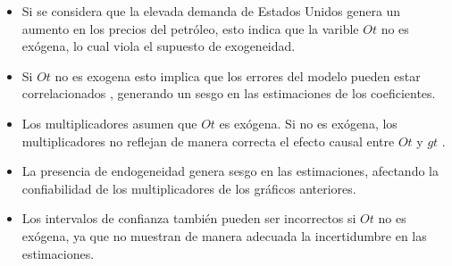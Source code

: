 \documentclass[
  12pt,
]{article}
\begin{document}
\begin{itemize}
\item
  Si se considera que la elevada demanda de Estados Unidos genera un
  aumento en los precios del petróleo, esto indica que la varible \(Ot\)
  no es exógena, lo cual viola el supuesto de exogeneidad.
\item
  Si \(Ot\) no es exogena esto implica que los errores del modelo pueden
  estar correlacionados , generando un sesgo en las estimaciones de los
  coeficientes.
\item
  Los multiplicadores asumen que \(Ot\) es exógena. Si no es exógena,
  los multiplicadores no reflejan de manera correcta el efecto causal
  entre \(Ot\) y \(gt\) .
\item
  La presencia de endogeneidad genera sesgo en las estimaciones,
  afectando la confiabilidad de los multiplicadores de los gráficos
  anteriores.
\item
  Los intervalos de confianza también pueden ser incorrectos si \(Ot\)
  no es exógena, ya que no muestran de manera adecuada la incertidumbre
  en las estimaciones.
\end{itemize}
\end{document}
